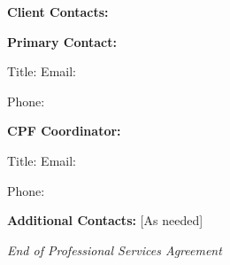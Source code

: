 \documentclass[11pt,a4paper]{article}
\begin{document}
\vspace{2em}

\textbf{Client Contacts:}

\textbf{Primary Contact:} \underline{\hspace{8cm}}

Title: \underline{\hspace{6cm}} Email: \underline{\hspace{6cm}}

Phone: \underline{\hspace{4cm}}

\vspace{1em}

\textbf{CPF Coordinator:} \underline{\hspace{8cm}}

Title: \underline{\hspace{6cm}} Email: \underline{\hspace{6cm}}

Phone: \underline{\hspace{4cm}}

\vspace{1em}

\textbf{Additional Contacts:} [As needed]

\vspace{2em}

\begin{center}
\textit{End of Professional Services Agreement}
\end{center}
\end{document}
